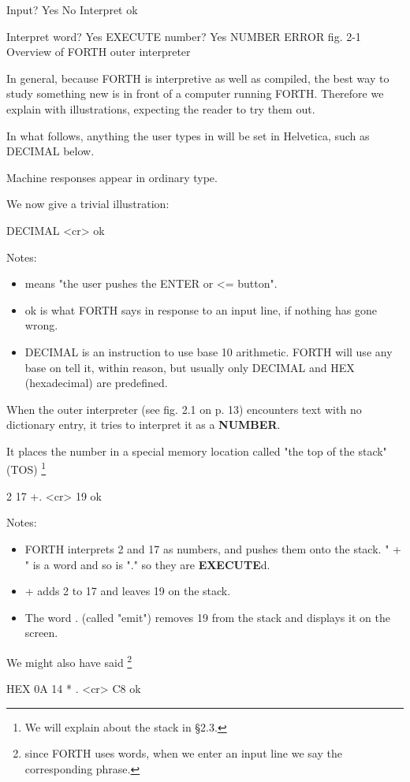 Input? Yes
No Interpret
ok

Interpret
word? Yes EXECUTE
number? Yes NUMBER
ERROR
fig. 2-1 Overview of FORTH outer interpreter

In general, because FORTH is interpretive as well as compiled, the best way to study something new is in front of a computer running FORTH. Therefore we explain with illustrations, expecting the reader to try them out.

In what follows, anything the user types in will be set in Helvetica, such as DECIMAL below.

Machine responses appear in ordinary type.

We now give a trivial illustration:

DECIMAL <cr> ok

Notes:
\begin{itemize}
  \item < cr > means "the user pushes the ENTER or <= button".
  \item ok is what FORTH says in response to an input line, if nothing has gone wrong.
  \item DECIMAL is an instruction to use base 10 arithmetic. FORTH will use any base on tell it, within reason, but usually only DECIMAL and HEX (hexadecimal) are predefined.
\end{itemize}

When the outer interpreter (see fig. 2.1 on p. 13) encounters text with no dictionary entry, it tries to interpret it as a \textbf{NUMBER}.

It places the number in a special memory location called "the top of the stack" (TOS)  \footnote{We will explain about the stack in §2.3.}

2 17 +. <cr> 19 ok

Notes:
\begin{itemize}
  \item FORTH interprets 2 and 17 as numbers, and pushes them onto the stack. " + " is a word and so is "." so they are \textbf{EXECUTE}d.
  \item + adds 2 to 17 and leaves 19 on the stack.
  \item The word . (called "emit") removes 19 from the stack and displays it on the screen.
\end{itemize}

We might also have said \footnote{since FORTH uses words, when we enter an input line we say the corresponding phrase.}

HEX 0A 14 * . <cr> C8 ok

